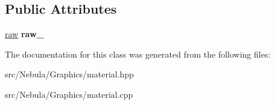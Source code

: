 \subsection*{\-Public \-Attributes}
\begin{DoxyCompactItemize}
\item 
\hypertarget{classNeb_1_1material_1_1material_aba15a8b4c829ec39dfb71ccfcc1ad1f6}{\hyperlink{structNeb_1_1material_1_1raw}{raw} {\bfseries raw\-\_\-}}\label{classNeb_1_1material_1_1material_aba15a8b4c829ec39dfb71ccfcc1ad1f6}

\end{DoxyCompactItemize}


\-The documentation for this class was generated from the following files\-:\begin{DoxyCompactItemize}
\item 
src/\-Nebula/\-Graphics/material.\-hpp\item 
src/\-Nebula/\-Graphics/material.\-cpp\end{DoxyCompactItemize}

